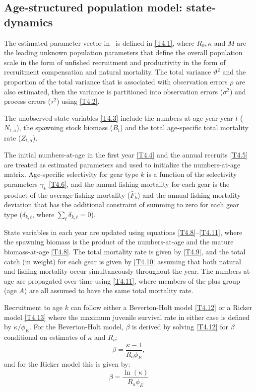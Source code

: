 \subsection{Age-structured population model: state-dynamics}
\begin{multicols}{2}
The estimated parameter vector in \iscam\ is defined in \eqref{T4.1}, where $R_0, \kappa$ and $M$ are the leading unknown population parameters that define the overall population scale in the form of unfished recruitment and productivity in the form of recruitment compensation and natural mortality.  The total variance $\vartheta^2$ and the proportion of the total variance that is associated with observation errors $\rho$ are also estimated, then the variance is partitioned into observation errors ($\sigma^2$) and process errors ($\tau^2$) using \eqref{T4.2}.

The unobserved state variables \eqref{T4.3} include the numbers-at-age year year $t$ ($N_{t,a}$), the spawning stock biomass ($B_t$) and the total age-specific total mortality rate ($Z_{t,a}$).

The initial numbers-at-age in the first year \eqref{T4.4} and the annual recruits \eqref{T4.5} are treated as estimated parameters and used to initialize the numbers-at-age matrix.  Age-specific selectivity for gear type $k$ is a function of the selectivity parameters $\gamma_k$ \eqref{T4.6}, and the annual fishing mortality for each gear is the product of the average fishing mortality ($\bar{F}_k$) and the annual fishing mortality deviation that has the additional constraint of summing to zero for each gear type ($\delta_{k,t}$, where $\sum_t \delta_{k,t}=0$).

State variables in each year are updated using equations \ref{T4.8}--\ref{T4.11}, where the spawning biomass is the product of the numbers-at-age and the mature biomass-at-age \eqref{T4.8}.  The total mortality rate is given by \eqref{T4.9}, and the total catch (in weight) for each gear is given by \eqref{T4.10} assuming that both natural and fishing mortality occur simultaneously throughout the year.  The numbers-at-age are propagated over time using \eqref{T4.11}, where members of the plus group (age $A$) are all assumed to have the same total mortality rate.  

Recruitment to age $k$ can follow either a Beverton-Holt model \eqref{T4.12} or a Ricker model \eqref{T4.13} where the maximum juvenile survival rate in either case is defined by $\kappa/\phi_E$.  For the Beverton-Holt model, $\beta$ is derived by solving \eqref{T4.12} for $\beta$ conditional on estimates of $\kappa$ and $R_o$:
\[
\beta = \frac{\kappa-1}{R_o \phi_E},
\]
and for the Ricker model this is given by:
\[
\beta = \frac{\ln(\kappa)}{R_o \phi_E}
\]


\end{multicols}

